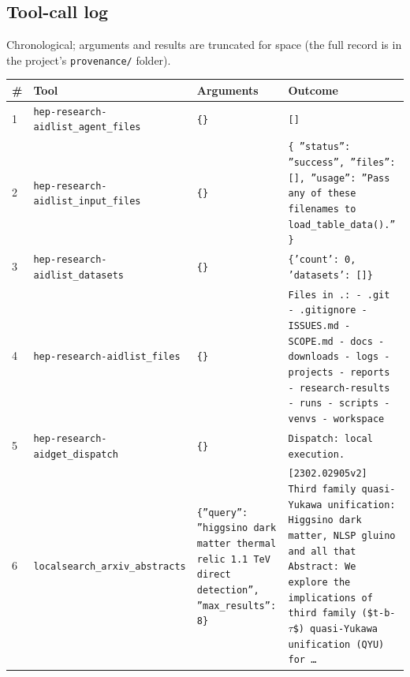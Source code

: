 \documentclass[11pt,a4paper]{article}
\begin{document}
\subsection{Tool-call log}
Chronological; arguments and results are truncated for space (the full record is in the project's \texttt{provenance/} folder).
\begin{longtable}{@{}p{}p{}p{}p{}@{}}
\toprule \# & Tool & Arguments & Outcome \\ \midrule \endhead
1 & \texttt{hep-research-aid}\newline\texttt{list\_\allowbreak{}agent\_\allowbreak{}files} & \texttt{\{\}\allowbreak{}} & \texttt{[]\allowbreak{}} \\
2 & \texttt{hep-research-aid}\newline\texttt{list\_\allowbreak{}input\_\allowbreak{}files} & \texttt{\{\}\allowbreak{}} & \texttt{\{   ''status'':\allowbreak{} ''success'',\allowbreak{}   ''files'':\allowbreak{} []\allowbreak{},\allowbreak{}   ''usage'':\allowbreak{} ''Pass any of these filenames to load\_\allowbreak{}table\_\allowbreak{}data()\allowbreak{}.'' \}\allowbreak{}} \\
3 & \texttt{hep-research-aid}\newline\texttt{list\_\allowbreak{}datasets} & \texttt{\{\}\allowbreak{}} & \texttt{\{'count':\allowbreak{} 0,\allowbreak{} 'datasets':\allowbreak{} []\allowbreak{}\}\allowbreak{}} \\
4 & \texttt{hep-research-aid}\newline\texttt{list\_\allowbreak{}files} & \texttt{\{\}\allowbreak{}} & \texttt{Files in .:\allowbreak{}   - .git   - .gitignore   - ISSUES.md   - SCOPE.md   - docs   - downloads   - logs   - projects   - reports   - research-results   - runs   - scripts   - venvs   - workspace} \\
5 & \texttt{hep-research-aid}\newline\texttt{get\_\allowbreak{}dispatch} & \texttt{\{\}\allowbreak{}} & \texttt{Dispatch:\allowbreak{} local execution.} \\
6 & \texttt{local}\newline\texttt{search\_\allowbreak{}arxiv\_\allowbreak{}abstracts} & \texttt{\{''query'':\allowbreak{} ''higgsino dark matter thermal relic 1.1 TeV direct detection'',\allowbreak{} ''max\_\allowbreak{}results'':\allowbreak{} 8\}\allowbreak{}} & \texttt{[2302.02905v2]\allowbreak{} Third family quasi-Yukawa unification:\allowbreak{} Higgsino dark matter,\allowbreak{} NLSP gluino and all that Abstract:\allowbreak{} We explore the implications of third family (\$t-b-$\tau$\$)\allowbreak{} quasi-Yukawa unification (QYU)\allowbreak{} for \ldots{}\allowbreak{}} \\

\end{longtable}
\end{document}
